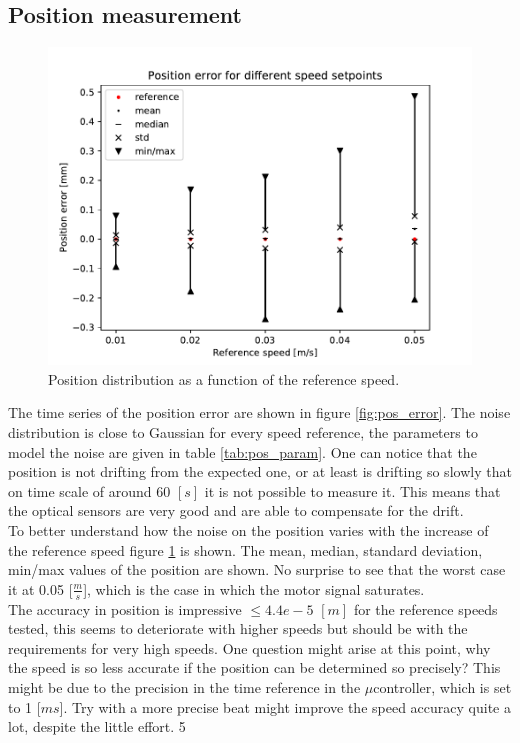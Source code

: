 \documentclass[12pt,a4paper, twoside]{article}
\begin{document}
\subsection{Position measurement} 
\begin{figure}
	\vspace{-1cm}
	\centering
	\includegraphics[width=\linewidth]{fig/pos_error_comp}
	\caption{Position distribution as a function of the reference speed.}\label{fig:pos_error_comp}
\end{figure}
The time series of the position error are shown in figure \ref{fig:pos_error}.
The noise distribution is close to Gaussian for every speed reference, the parameters to model the noise are given in table \ref{tab:pos_param}. One can notice that the position is not drifting from the expected one, or at least is drifting so slowly that on time scale of around $60$ $[s]$ it is not possible to measure it. This means that the optical sensors are very good and are able to compensate for the drift.\\
To better understand how the noise on the position varies with the increase of the reference speed figure \ref{fig:pos_error_comp} is shown.
 The mean, median, standard deviation, min/max values of the position are shown. No surprise to see that the worst case it at 0.05 [$\frac{m}{s}$], which is the case in which the motor signal saturates.\\
 
 The accuracy in position is impressive $\leq 4.4e-5$ $[m]$ for the reference speeds tested, this seems to deteriorate with higher speeds but should be with the requirements for very high speeds. One question might arise at this point, why the speed is so less accurate if the position can be determined so precisely? This might be due to the precision in the time reference in the $\mu$controller, which is set to 1 [$ms$]. Try with a more precise beat might improve the speed accuracy quite a lot, despite the little effort.
5
\end{document}
